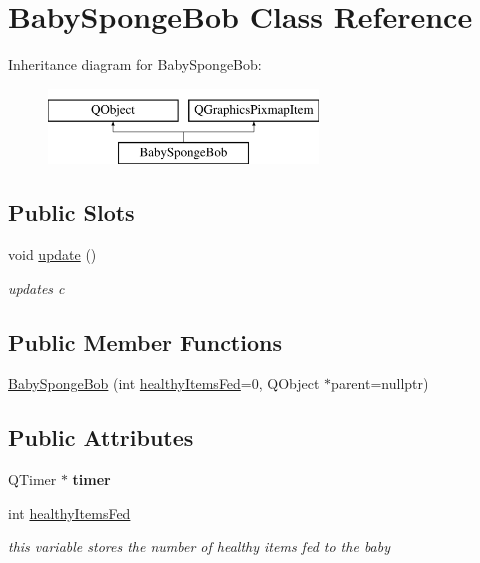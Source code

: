 \hypertarget{classBabySpongeBob}{\section{Baby\-Sponge\-Bob Class Reference}
\label{classBabySpongeBob}
}
Inheritance diagram for Baby\-Sponge\-Bob\-:\begin{figure}[H]
\begin{center}
\leavevmode
\includegraphics[height=2.000000cm]{classBabySpongeBob}
\end{center}
\end{figure}
\subsection*{Public Slots}
\begin{DoxyCompactItemize}
\item 
void \hyperlink{classBabySpongeBob_a64d2c583237fceaff5e99a23295f4119}{update} ()
\begin{DoxyCompactList}\small\item\em updates c \end{DoxyCompactList}\end{DoxyCompactItemize}
\subsection*{Public Member Functions}
\begin{DoxyCompactItemize}
\item 
\hyperlink{classBabySpongeBob_a1d0fe9d631ee9aee6b838ecf76bc00f2}{Baby\-Sponge\-Bob} (int \hyperlink{classBabySpongeBob_a072dca2ee666af5a39be11e152a04b2c}{healthy\-Items\-Fed}=0, Q\-Object $\ast$parent=nullptr)
\end{DoxyCompactItemize}
\subsection*{Public Attributes}
\begin{DoxyCompactItemize}
\item 
\hypertarget{classBabySpongeBob_acfb8d9ea28550ff76e80bf1adc335ad8}{Q\-Timer $\ast$ {\bfseries timer}}\label{classBabySpongeBob_acfb8d9ea28550ff76e80bf1adc335ad8}

\item 
\hypertarget{classBabySpongeBob_a072dca2ee666af5a39be11e152a04b2c}{int \hyperlink{classBabySpongeBob_a072dca2ee666af5a39be11e152a04b2c}{healthy\-Items\-Fed}}\label{classBabySpongeBob_a072dca2ee666af5a39be11e152a04b2c}

\begin{DoxyCompactList}\small\item\em this variable stores the number of healthy items fed to the baby \end{DoxyCompactList}\end{DoxyCompactItemize}


